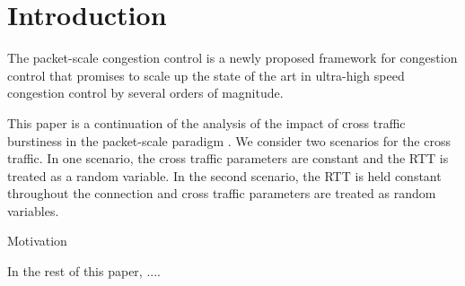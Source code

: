 \section{Introduction}
  The packet-scale congestion control is a newly proposed framework for 
  congestion control that promises to scale up the state of the art in 
  ultra-high speed congestion control by several orders of magnitude.

  This paper is a continuation of the analysis of the impact of cross traffic 
  burstiness in the packet-scale paradigm \cite{Lovewell2011-Noise-TR}. We 
  consider two scenarios 
  for the cross traffic. In one scenario, the cross traffic parameters are 
  constant and the RTT is treated as a random variable. In the second 
  scenario, the RTT is held constant throughout the connection and cross 
  traffic parameters are treated as random variables.

  Motivation

  In the rest of this paper, ....

